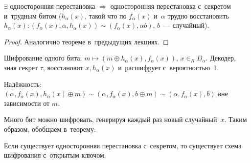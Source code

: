 \documentclass{article}
\begin{document}
\begin{theorem}
	$\exists$ односторонняя перестановка $\Rightarrow$ односторонняя перестановка
	с~секретом и~трудным битом ($h_\alpha(x)$, такой что по $f_\alpha(x)$
	и~$\alpha$ трудно восстановить $h_\alpha(x): (f_\alpha(x), \alpha,
	h_\alpha(x)) \sim (f_\alpha(x), \alpha b)$, $b$~--- случайный).
\end{theorem}
\begin{proof}
	Аналогично теореме в~предыдущих лекциях.
\end{proof}

Шифрование одного бита: $m \mapsto (m \oplus h_\alpha(x), f_\alpha(x))$, $x
\in_R D_\alpha$. Декодер, зная секрет $\tau$, восстановит $x, h_\alpha(x)$
и~расшифрует с~вероятностью~1.

Надёжность: $(\alpha, f_\alpha(x), h_\alpha(x) \oplus m) \sim (\alpha,
f_\alpha(x), b \oplus m) \sim (\alpha, f_\alpha(x), b)$ вне зависимости от $m$.

Много бит можно шифровать, генерируя каждый раз новый случайный~$x$. Таким
образом, обобщаем в~теорему:

\begin{theorem}
	Если существует односторонняя перестановка с~секретом, то существует схема
	шифрования с~открытым ключом.
\end{theorem}
\end{document}
